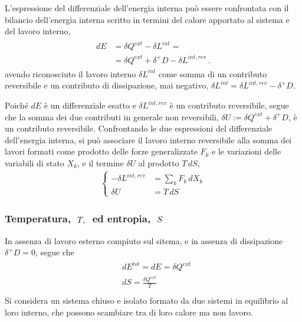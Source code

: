 \documentclass[letterpaper,10pt,italian]{jupyterBook}
\begin{document}
\sphinxAtStartPar
L’espressione del differenziale dell’energia interna può essere confrontata con il bilancio dell’energia interna scritto in termini del calore apportato al sistema e del lavoro interno,
\begin{equation*}
\begin{split}\begin{aligned}
  d E & = \delta Q^{ext} - \delta L^{int} = \\
      & = \delta Q^{ext} + \delta^+ D - \delta L^{int,rev} \ .
\end{aligned}\end{split}
\end{equation*}
\sphinxAtStartPar
avendo riconosciuto il lavoro interno \(\delta L^{int}\) come somma di un contributo reversibile e un contributo di dissipazione, mai negativo, \(\delta L^{int} = \delta L^{int,rev} - \delta^+ D\).

\sphinxAtStartPar
Poiché \(d E\) è un differenziale esatto e \(\delta L^{int,rev}\) è un contributo reversibile, segue che la somma dei due contributi in generale non reversibili, \(\delta U := \delta Q^{ext} + \delta^+ D\), è un contributo reversibile. Confrontando le due espressioni del differenziale dell’energia interna, si può associare il lavoro interno reversibile alla somma dei lavori formati come prodotto delle forze generalizzate \(F_k\) e le variazioni delle variabili di stato \(X_k\), e il termine \(\delta U\) al prodotto \(T \, dS\),
\begin{equation*}
\begin{split}\begin{cases}
  -\delta L^{int,rev} & = \displaystyle\sum_k F_k \, d X_k \\
  \delta U            & = T \, dS
\end{cases}\end{split}
\end{equation*}\subsubsection*{Temperatura, \protect\(\ T, \ \protect\) ed entropia, \protect\(\ S\protect\)}

\sphinxAtStartPar
In assenza di lavoro esterno compiuto sul sitema, e in assenza di dissipazione \(\delta^+ D = 0\), segue che
\begin{equation*}
\begin{split}\begin{aligned}
 & d E^{tot} = d E = \delta Q^{ext} \\
 & d S = \frac{\delta Q^{ext}}{T} \\
\end{aligned}\end{split}
\end{equation*}
\sphinxAtStartPar
Si considera un sistema chiuso e isolato formato da due sistemi in equilibrio al loro interno, che possono scambiare tra di loro calore ma non lavoro.
\end{document}
